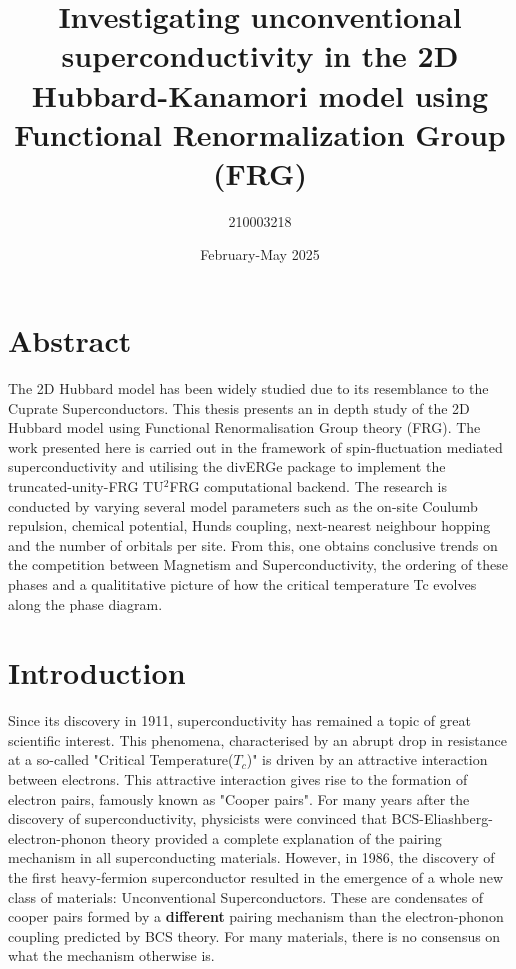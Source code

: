 \documentclass[12pt]{article}
\title{Investigating unconventional superconductivity in the 2D Hubbard-Kanamori model using Functional Renormalization Group (FRG)}
\author{210003218}
\date{February-May 2025}
\begin{document}
\maketitle
\tableofcontents 


\section{Abstract}
 
The 2D Hubbard model has been widely studied due to its resemblance to the Cuprate Superconductors. 
This thesis presents an in depth study of the 2D Hubbard model using Functional Renormalisation Group theory (FRG).
The work presented here is carried out in the framework of spin-fluctuation mediated superconductivity and utilising the divERGe package
to implement the truncated-unity-FRG TU$^2$FRG computational backend. The research is conducted by varying several model
parameters such as the on-site Coulumb repulsion, chemical potential, Hunds
coupling, next-nearest neighbour hopping and the number of orbitals per site. From this, one obtains conclusive trends on the 
competition between Magnetism and Superconductivity, the ordering of these phases and  a qualititative picture of how the critical temperature Tc evolves along the
phase diagram. 



\section{Introduction}

Since its discovery in 1911\cite{onnes1911superconductivity}, superconductivity has remained a topic of great scientific interest.
This phenomena, characterised by an abrupt drop in resistance at a so-called "Critical Temperature($T_c$)"\cite{geballe2015tc} is driven by an attractive interaction
between electrons. This attractive interaction gives rise to the formation of electron pairs, famously known as "Cooper pairs"\cite{schrieffer2018theory}. For many 
years after the discovery of superconductivity, physicists
were convinced that BCS-Eliashberg-electron-phonon theory \cite{schrieffer2018theory} provided a complete explanation of the pairing mechanism in all superconducting materials. 
However, in 1986, the discovery of the first heavy-fermion superconductor\cite{bednorz1986possible} resulted in the emergence of a whole new class of materials: Unconventional Superconductors. 
These are condensates of cooper pairs formed by a \textbf{different} pairing mechanism than the electron-phonon coupling predicted by BCS theory\cite{hirsch2015superconducting}.
For many materials, there is no consensus on what the mechanism otherwise is.\par 
\medskip
\end{document}
